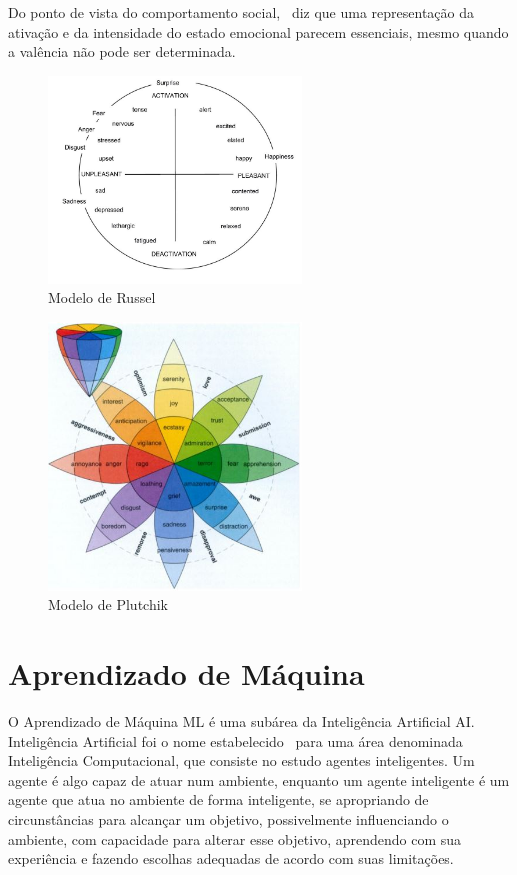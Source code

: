 Do ponto de vista do comportamento social,~\cite{16} diz que uma representação da ativação e da intensidade do estado emocional parecem essenciais, mesmo quando a valência não pode ser determinada.

\begin{figure}[!ht]
\centering
\includegraphics[width=0.6\textwidth]{img/russel.JPG}
\caption{\label{fig:russel}Modelo de Russel~\cite{25}}
\end{figure}

\begin{figure}[!h]
\centering
\includegraphics[width=0.6\textwidth]{img/plutchik.JPG}
\caption{\label{fig:plutchik}Modelo de Plutchik~\cite{57}}
\end{figure}

\section{Aprendizado de Máquina}\label{sec:ml}

O Aprendizado de Máquina \acrshort{ML} é uma subárea da Inteligência Artificial \acrfull{AI}. Inteligência Artificial foi o nome estabelecido~\cite{12.23} para uma área denominada Inteligência Computacional, que consiste no estudo agentes inteligentes. Um agente é algo capaz de atuar num ambiente, enquanto um agente inteligente é um agente que atua no ambiente de forma inteligente, se apropriando de circunstâncias para alcançar um objetivo, possivelmente influenciando o ambiente, com capacidade para alterar esse objetivo, aprendendo com sua experiência e fazendo escolhas adequadas de acordo com suas limitações.

